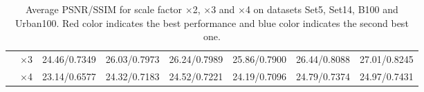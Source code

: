 \documentclass[10pt,twocolumn,letterpaper]{article}
\begin{document}
\begin{table}
\begin{center}
\begin{tabular}{ | c | c | c | c | c | c | c | c | }
 & $\times$3 & 24.46/0.7349 & 26.03/0.7973 & 26.24/0.7989 & 25.86/0.7900 & {\color{blue}26.44}/{\color{blue}0.8088} & {\color{red}27.01}/{\color{red}0.8245}\\
 & $\times$4 & 23.14/0.6577 & 24.32/0.7183 & 24.52/0.7221 & 24.19/0.7096 & {\color{blue}24.79}/{\color{blue}0.7374} & {\color{red}24.97}/{\color{red}0.7431}\\
\hline
\end{tabular}
\caption{Average PSNR/SSIM for scale factor $\times$2, $\times$3 and $\times$4 on datasets Set5, Set14, B100 and Urban100. {\color{red}Red color} indicates the best performance and {\color{blue}blue color} indicates the second best one.}
\label{tbl:benchmark}
\end{center}
\end{table}
\end{document}

